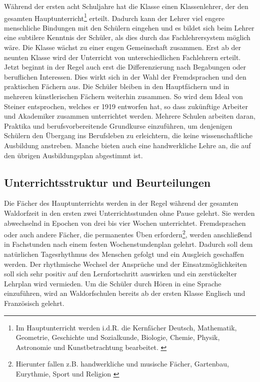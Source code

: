 Während der ersten acht Schuljahre hat die Klasse einen Klassenlehrer, der den gesamten Hauptunterricht\footnote{Im Hauptunterricht werden i.d.R. die Kernfächer Deutsch, Mathematik, Geometrie, Geschichte und Sozialkunde, Biologie, Chemie, Physik, Astronomie und Kunstbetrachtung bearbeitet. \citep[Vgl.][S. 50]{kiersch07}} erteilt. Dadurch kann der Lehrer viel engere menschliche Bindungen mit den Schülern eingehen und es bildet sich beim Lehrer eine subtilere Kenntnis der Schüler, als dies durch das Fachlehrersystem möglich wäre. Die Klasse wächst zu einer engen Gemeinschaft zusammen. Erst ab der neunten Klasse wird der Unterricht von unterschiedlichen Fachlehrern erteilt. Jetzt beginnt in der Regel auch erst die Differenzierung nach Begabungen oder beruflichen Interessen. Dies wirkt sich in der Wahl der Fremdsprachen und den praktischen Fächern aus. Die Schüler bleiben in den Hauptfächern und in mehreren künstlerischen Fächern weiterhin zusammen. So wird dem Ideal von Steiner entsprochen, welches er 1919 entworfen hat, so dass zukünftige Arbeiter und Akademiker zusammen unterrichtet werden. Mehrere Schulen arbeiten daran, Praktika und berufsvorbereitende Grundkurse einzuführen, um denjenigen Schülern den Übergang ins Berufsleben zu erleichtern, die keine wissenschaftliche Ausbildung anstreben. Manche bieten auch eine handwerkliche Lehre an, die auf den übrigen Ausbildungsplan abgestimmt ist.  \citep[Vgl.][]{kiersch07, hemleben63}

\subsection{Unterrichtsstruktur und Beurteilungen} %
\label{sub:unterrichtsstruktur_und_Beurteilungen}
Die Fächer des Hauptunterrichts werden in der Regel während der gesamten Waldorfzeit in den ersten zwei Unterrichtsstunden ohne Pause gelehrt. Sie werden abwechselnd in Epochen von drei bis vier Wochen unterrichtet. Fremdsprachen oder auch andere Fächer, die permanentes Üben erfordern\footnote{Hierunter fallen z.B. handwerkliche und musische Fächer, Gartenbau, Eurythmie, Sport und Religion \citep[Vgl.][]{waldorfschule13}}, werden anschließend in Fachstunden nach einem festen Wochenstundenplan gelehrt. Dadurch soll dem natürlichen Tagesrhythmus des Menschen gefolgt und ein Ausgleich geschaffen werden. Der rhythmische Wechsel der Ansprüche und der Einsatzmöglichkeiten soll sich sehr positiv auf den Lernfortschritt auswirken und ein zerstückelter Lehrplan wird vermieden. Um die Schüler durch Hören in eine Sprache einzuführen, wird an Waldorfschulen bereits ab der ersten Klasse Englisch und Französisch gelehrt. \citep[Vgl.][]{kiersch07, hemleben63} 

